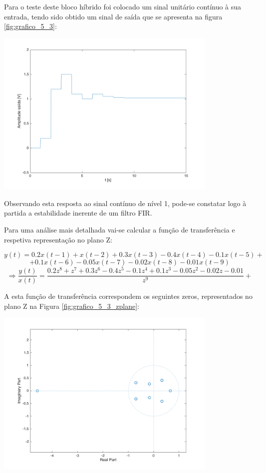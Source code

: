 \documentclass[a4paper,11pt]{report}
\begin{document}
Para o teste deste bloco híbrido foi colocado um sinal unitário contínuo à sua entrada, tendo sido obtido um sinal de saída que se apresenta na figura \ref{fig:grafico_5_3}:

\begin{center}
     \includegraphics[angle=0,width=0.8\textwidth]{grafico_5_3.png}
     \label{fig:grafico_5_3}
\end{center}

Observando esta resposta ao sinal contínuo de nível 1, pode-se constatar logo à partida a estabilidade inerente de um filtro FIR. 

Para uma análise mais detalhada vai-se calcular a função de transferência e respetiva representação no plano Z:

$$y(t)=0.2x(t-1)+x(t-2)+0.3x(t-3)-0.4x(t-4)-0.1x(t-5)+$$
$$+0.1x(t-6)-0.05x(t-7)-0.02x(t-8)-0.01x(t-9)$$
$$\Rightarrow \frac{y(t)}{x(t)}=\frac{0.2z^8+z^7+0.3z^6-0.4z^5-0.1z^4+0.1z^3-0.05z^2-0.02z-0.01}{z^{9}}+$$

A esta função de transferência correspondem os seguintes zeros, representados no plano Z na Figura \ref{fig:grafico_5_3_zplane}:

\begin{center}
     \includegraphics[angle=0,width=0.8\textwidth]{grafico_5_3_zplane.png}
     \label{fig:grafico_5_3_zplane}
\end{center}
\end{document}
